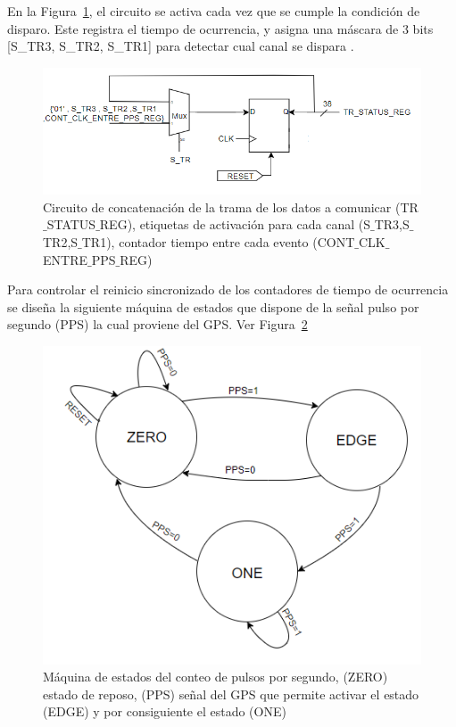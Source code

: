 En la Figura~\ref{flancos}, el circuito se activa cada vez que se cumple la condición de disparo. Este registra el tiempo de ocurrencia, y asigna una máscara de 3 bits [S\_TR3, S\_TR2, S\_TR1] para detectar cual canal se dispara .

\begin{figure}[H]
\includegraphics[scale=0.9]{Figs/tr_status.PNG} 
\centering
\caption[Circuito concatenación trama de datos a comunicar protocolo SPI ]{Circuito de concatenación de la trama de los datos a comunicar (TR$\_$STATUS$\_$REG), etiquetas de activación para cada canal (S$\_$TR3,S$\_$TR2,S$\_$TR1), contador tiempo entre cada evento (CONT$\_$CLK$\_$ENTRE$\_$PPS$\_$REG)}
\label{flancos}
\end{figure}

Para controlar el reinicio sincronizado de los contadores de tiempo de ocurrencia se diseña la siguiente máquina de estados que dispone de la señal pulso por segundo (PPS) la cual proviene del GPS. Ver Figura~\ref{pps}
\begin{figure}[h!]
\includegraphics[scale=0.8]{Figs/MAQUINA1.PNG} 
\centering
\caption[Máquina de estados del conteo de pulsos por segundo]{Máquina de estados del conteo de pulsos por segundo, (ZERO) estado de reposo, (PPS) señal del GPS que permite activar el estado (EDGE) y por consiguiente el estado (ONE)}
\label{pps}
\end{figure}

